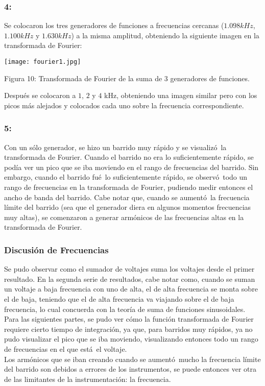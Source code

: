\documentclass{article}
\begin{document}
\subsubsection*{4:}
Se colocaron los tres generadores de funciones a frecuencias cercanas ($1.098kHz$, $1.100kHz$ y $1.630kHz$) a la misma amplitud, obteniendo la siguiente imagen en la transformada de Fourier:
\begin{center}
\texttt{[image: fourier1.jpg]}
\end{center}
\begin{center}
Figura 10: Transformada de Fourier de la suma de 3 generadores de funciones.
\end{center}
Despu\'es se colocaron a $1$, $2$ y $4$ kHz, obteniendo una imagen similar pero con los picos m\'as alejados y colocados cada uno sobre la frecuencia correspondiente.

\subsubsection*{5:}
Con un s\'olo generador, se hizo un barrido muy r\'apido y se visualiz\'o\ la transformada de Fourier. Cuando el barrido no era lo suficientemente r\'apido, se pod\'ia ver un pico que se iba moviendo en el rango de frecuencias del barrido. Sin embargo, cuando el barrido fu\'e\ lo suficientemente r\'apido, se observ\'o\ todo un rango de frecuencias en la transformada de Fourier, pudiendo medir entonces el ancho de banda del barrido. Cabe notar que, cuando se aument\'o\ la frecuencia l\'imite del barrido (sea que el generador diera en algunos momentos frecuencias muy altas), se comenzaron a generar arm\'onicos de las frecuencias altas en la transformada de Fourier.

\subsubsection{Discusi\'on de Frecuencias}
Se pudo observar como el sumador de voltajes suma los voltajes desde el primer resultado. En la segunda serie de resultados, cabe notar como, cuando se suman un voltaje a baja frecuencia con uno de alta, el de alta frecuencia se monta sobre el de baja, teniendo que el de alta frecuencia va viajando sobre el de baja frecuencia, lo cual concuerda con la teor\'ia de suma de funciones sinusoidales. \\
Para las siguientes partes, se pudo ver c\'omo la funci\'on transformada de Fourier requiere cierto tiempo de integraci\'on, ya que, para barridos muy r\'apidos, ya no pudo visualizar el pico que se iba moviendo, visualizando entonces todo un rango de frecuencias en el que est\'a\ el voltaje. \\
Los arm\'onicos que se iban creando cuando se aument\'o\ mucho la frecuencia l\'imite del barrido son debidos a errores de los instrumentos, se puede entonces ver otra de las limitantes de la instrumentaci\'on: la frecuencia.
\end{document}
